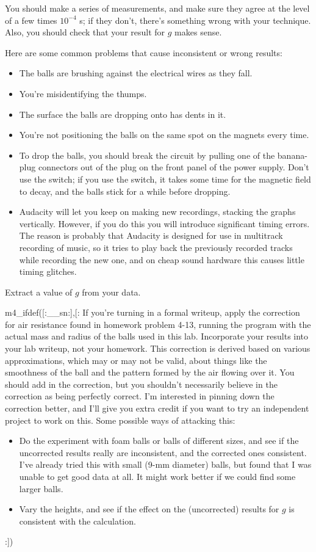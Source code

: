 You should make a series of measurements, and
make sure they agree at the level of a few times $10^{-4}$ s; if they
don't, there's something wrong with your technique. Also, you
should check that your result for $g$ makes sense.

Here are some common problems that cause inconsistent or wrong results:
\begin{itemize}
\item[] The balls are brushing against the electrical wires as they fall.
\item[] You're misidentifying the thumps.
\item[] The surface the balls are dropping onto has dents in it. 
\item[] You're not positioning the balls on the same spot on the magnets every time.
\item[] To drop the balls, you should break the circuit by pulling one of the banana-plug connectors out of the plug on the front
panel of the power supply. Don't use the switch; if you use the switch, it takes some time for the magnetic field to decay, and the balls stick for a while before dropping. 
\item[] Audacity will let you keep on making new recordings, stacking the graphs
vertically. However, if you do this you will introduce significant timing
errors. The reason is probably that Audacity is designed for use in multitrack recording
of music, so it tries to play back the previously recorded tracks while recording the
new one, and on cheap sound hardware this causes little timing glitches.
\end{itemize}

\analysis

Extract a value of $g$ from your data.

m4_ifdef([:__sn:],[:%
If you're turning in a formal writeup,
apply the correction for air resistance found in homework problem 4-13, running the program with the actual mass and radius of
the balls used in this lab. Incorporate your results into your lab writeup, not your homework.
This correction is derived based on various approximations, which may or
may not be valid, about things like the smoothness of the ball and
the pattern formed by the air flowing over it. You should add in the
correction, but you shouldn't necessarily believe in the correction
as being perfectly correct. I'm interested in pinning down the correction
better, and I'll give you extra credit if you want to try an independent
project to work on this. Some possible ways of attacking this:
\begin{itemize}
\item[] Do the experiment with foam balls or balls of different sizes, and see if the
         uncorrected results really are inconsistent, and the corrected
         ones consistent. I've already tried this with small (9-mm diameter)
         balls, but found that I was unable to get good data at all. It might
         work better if we could find some larger balls.
\item[] Vary the heights, and see if the effect on the (uncorrected) results
         for $g$ is consistent with the calculation.
\end{itemize}
:])

